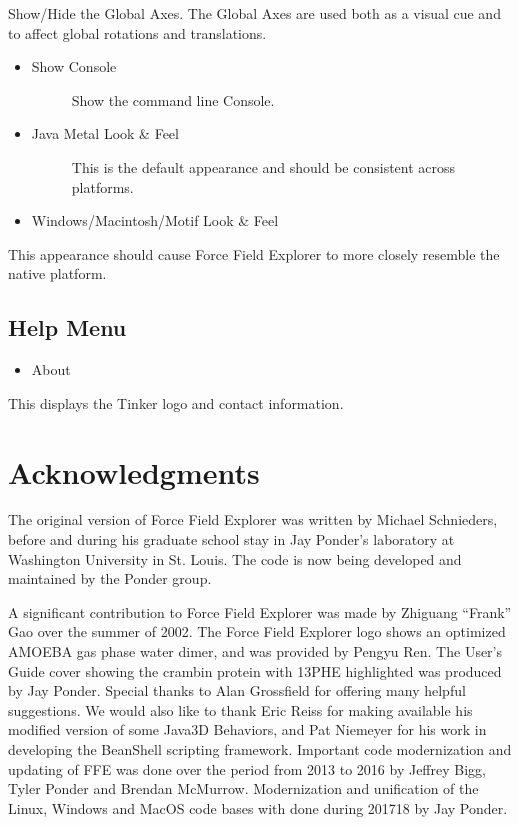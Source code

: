 \documentclass[letterpaper,11pt,english]{sphinxmanual}
\begin{document}
Show/Hide the Global Axes. The Global Axes are used both as a visual cue and to affect global rotations and translations.
\begin{itemize}
\item {} \begin{description}
\item[{Show Console}] \leavevmode
Show the command line Console.

\end{description}

\item {} \begin{description}
\item[{Java Metal Look \& Feel}] \leavevmode
This is the default appearance and should be consistent across platforms.

\end{description}

\item {} 
Windows/Macintosh/Motif Look \& Feel

\end{itemize}

This appearance should cause Force Field Explorer to more closely resemble the native platform.


\section{Help Menu}
\label{\detokenize{text/menus:help-menu}}\begin{itemize}
\item {} 
About

\end{itemize}

This displays the Tinker logo and contact information.


\chapter{Acknowledgments}
\label{\detokenize{text/acknowledgements:acknowledgments}}\label{\detokenize{text/acknowledgements::doc}}
The original version of Force Field Explorer was written by Michael Schnieders, before and during his graduate school stay in Jay Ponder’s laboratory at Washington University in St. Louis. The code is now being developed and maintained by the Ponder group.

A significant contribution to Force Field Explorer was made by Zhiguang “Frank” Gao over the summer of 2002. The Force Field Explorer logo shows an optimized AMOEBA gas phase water dimer, and was provided by Pengyu Ren. The User’s Guide cover showing the crambin protein with 13\sphinxhyphen{}PHE highlighted was produced by Jay Ponder. Special thanks to Alan Grossfield for offering many helpful suggestions. We would also like to thank Eric Reiss for making available his modified version of some Java3D Behaviors, and Pat Niemeyer for his work in developing the BeanShell scripting framework. Important code modernization and updating of FFE was done over the period from 2013 to 2016 by Jeffrey Bigg, Tyler Ponder and Brendan McMurrow. Modernization and unification of the Linux, Windows and MacOS code bases with done during 2017\sphinxhyphen{}18 by Jay Ponder.
\end{document}

